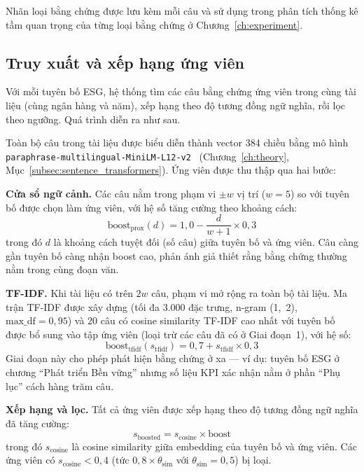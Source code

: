 Nhãn loại bằng chứng được lưu kèm mỗi câu và sử dụng trong phân tích thống kê tầm quan trọng của từng loại bằng chứng ở Chương~\ref{ch:experiment}.


\subsection{Truy xuất và xếp hạng ứng viên}
\label{subsec:candidate_retrieval}

Với mỗi tuyên bố ESG, hệ thống tìm các câu bằng chứng ứng viên trong cùng tài liệu (cùng ngân hàng và năm), xếp hạng theo độ tương đồng ngữ nghĩa, rồi lọc theo ngưỡng. Quá trình diễn ra như sau.

Toàn bộ câu trong tài liệu được biểu diễn thành vector 384 chiều bằng mô hình \texttt{paraphrase-multilingual-MiniLM-L12-v2}~\cite{reimers2019sentence} (Chương~\ref{ch:theory}, Mục~\ref{subsec:sentence_transformers}). Ứng viên được thu thập qua hai bước:

\textbf{Cửa sổ ngữ cảnh.} Các câu nằm trong phạm vi $\pm w$ vị trí ($w = 5$) so với tuyên bố được chọn làm ứng viên, với hệ số tăng cường theo khoảng cách:
\begin{equation}
    \text{boost}_{\text{prox}}(d) = 1{,}0 - \frac{d}{w + 1} \times 0{,}3
    \label{eq:proximity_boost}
\end{equation}
trong đó $d$ là khoảng cách tuyệt đối (số câu) giữa tuyên bố và ứng viên. Câu càng gần tuyên bố càng nhận boost cao, phản ánh giả thiết rằng bằng chứng thường nằm trong cùng đoạn văn.

\textbf{TF-IDF.} Khi tài liệu có trên $2w$ câu, phạm vi mở rộng ra toàn bộ tài liệu. Ma trận TF-IDF được xây dựng (tối đa 3.000 đặc trưng, n-gram (1,~2), $\text{max\_df} = 0{,}95$) và 20 câu có cosine similarity TF-IDF cao nhất với tuyên bố được bổ sung vào tập ứng viên (loại trừ các câu đã có ở Giai đoạn~1), với hệ số:
\begin{equation}
    \text{boost}_{\text{tfidf}}(s_{\text{tfidf}}) = 0{,}7 + s_{\text{tfidf}} \times 0{,}3
    \label{eq:tfidf_boost}
\end{equation}
Giai đoạn này cho phép phát hiện bằng chứng ở xa --- ví dụ: tuyên bố ESG ở chương ``Phát triển Bền vững'' nhưng số liệu KPI xác nhận nằm ở phần ``Phụ lục'' cách hàng trăm câu.

\textbf{Xếp hạng và lọc.} Tất cả ứng viên được xếp hạng theo độ tương đồng ngữ nghĩa đã tăng cường:
\begin{equation}
    s_{\text{boosted}} = s_{\text{cosine}} \times \text{boost}
    \label{eq:boosted_sim}
\end{equation}
trong đó $s_{\text{cosine}}$ là cosine similarity giữa embedding của tuyên bố và ứng viên. Các ứng viên có $s_{\text{cosine}} < 0{,}4$ (tức $0{,}8 \times \theta_{\text{sim}}$ với $\theta_{\text{sim}} = 0{,}5$) bị loại.


